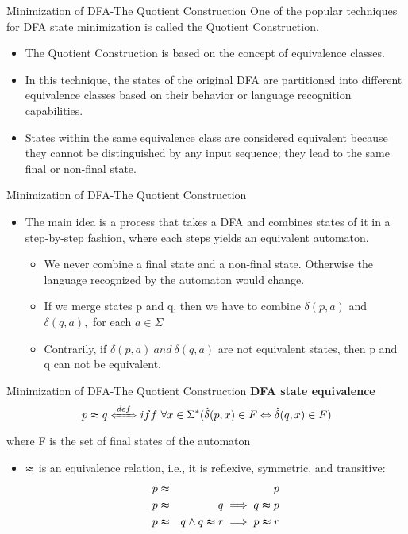 \documentclass{beamer}
\begin{document}
\begin{frame}{Minimization of DFA-The Quotient Construction}
	One of the popular techniques for DFA state minimization is called the Quotient Construction.
	\begin{itemize}
		\item The Quotient Construction is based on the concept of equivalence classes.
		\item In this technique, the states of the original DFA are partitioned into different equivalence classes based on their behavior or language recognition capabilities.
		\item States within the same equivalence class are considered equivalent because they cannot be distinguished by any input sequence; they lead to the same final or non-final state.
	\end{itemize}
\end{frame}
\begin{frame}{Minimization of DFA-The Quotient Construction}
	\begin{itemize}
		\item The main idea is a process that takes a DFA and combines states of it in
		a step-by-step fashion, where each steps yields an equivalent automaton.
		\begin{itemize}
			\item We never combine a final state and a non-final state. Otherwise the
			language recognized by the automaton would change.

			\item If we merge states p and q, then we have to combine $\delta(p,a)$ and
			$\delta(q,a),$ for each $a \in \Sigma$
			\item Contrarily, if $\delta(p,a)\  and \ \delta(q,a)$ are not equivalent states, then p and q can not be equivalent.
		\end{itemize}
	\end{itemize}
\end{frame}
\begin{frame}{Minimization of DFA-The Quotient Construction}
	\textbf{DFA state equivalence}
	$$p \thickapprox q \xLeftrightarrow{def} iff \ \forall x\in \Sigma^*(\hat{\delta}(p, x) \in F \Leftrightarrow \hat{\delta} (q, x) \in F)$$
	where F is the set of final states of the automaton
	\begin{itemize}
		\item $\thickapprox$ is an equivalence relation, i.e., it is reflexive, symmetric, and
		transitive:
		\begin{eqnarray*}
			 p &\thickapprox& p\\
		 p &\thickapprox& q\implies q \thickapprox p\\
		 p &\thickapprox& q \land q \thickapprox r\implies p \thickapprox r
\\
		\end{eqnarray*}
	\end{itemize}
\end{frame}
\end{document}

